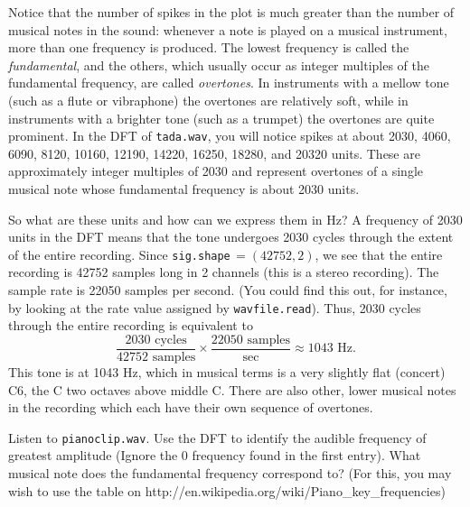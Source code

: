 Notice that the number of spikes in the plot is much greater than the number of musical notes in the sound: whenever a note is played on a musical instrument, more than one frequency is produced.
The lowest frequency is called the \emph{fundamental}, and the others, which usually occur as integer multiples of the fundamental frequency, are called \emph{overtones}.
In instruments with a mellow tone (such as a flute or vibraphone) the overtones are relatively soft, while in instruments with a brighter tone (such as a trumpet) the overtones are quite prominent.
In the DFT of \texttt{tada.wav}, you will notice spikes at about 2030, 4060, 6090, 8120, 10160, 12190, 14220, 16250, 18280, and 20320 units.
These are approximately integer multiples of 2030 and represent overtones of a single musical note whose fundamental frequency is about 2030 units.

So what are these units and how can we express them in Hz? 
A frequency of 2030 units in the DFT means that the tone undergoes 2030 cycles through the extent of the entire recording. 
Since \texttt{sig.shape}$\, = (42752, 2)$, we see that the entire recording is 42752 samples long in 2 channels (this is a stereo recording).
The sample rate is 22050 samples per second.
(You could find this out, for instance, by looking at the rate value assigned by \texttt{wavfile.read}). 
Thus, 2030 cycles through the entire recording is equivalent to
$$\frac{2030\text{ cycles}}{42752\text{ samples}} \times \frac{22050\text{ samples}}{\text{sec}} \approx 1043 \text{ Hz}.$$
This tone is at 1043 Hz, which in musical terms is a very slightly flat (concert) C6, the C two octaves above middle C.
There are also other, lower musical notes in the recording which each have their own sequence of overtones.

\begin{problem} %
Listen to \texttt{pianoclip.wav}.
Use the DFT to identify the audible frequency of greatest amplitude (Ignore the 0 frequency found in the first entry). 
What musical note does the fundamental frequency correspond to?
(For this, you may wish to use the table on http://en.wikipedia.org/wiki/Piano\_key\_frequencies)
\end{problem}


